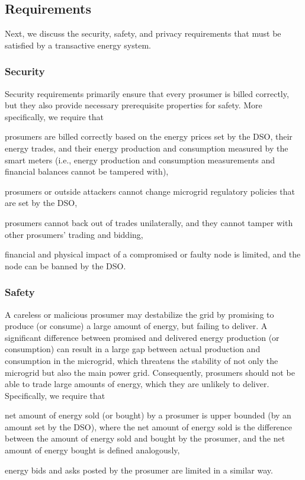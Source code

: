 \subsection{Requirements}
Next, we discuss the security, safety, and privacy requirements that must be satisfied by a transactive energy system.

\subsubsection{Security}
Security requirements primarily ensure that every prosumer is billed correctly, but they also provide necessary prerequisite properties for safety.
More specifically, we require that 
\begin{compactitem}
\item prosumers are billed correctly based on the energy prices set by the DSO, their energy trades, and their energy production and consumption measured by the smart meters (i.e., energy production and consumption measurements and financial balances cannot be tampered with),
\item prosumers or outside attackers cannot change microgrid regulatory policies that are set by the DSO,
\item prosumers cannot back out of trades unilaterally, and they cannot tamper with other prosumers' trading and bidding,
\item financial and physical impact of a compromised or faulty node is limited, and the node can be banned by the DSO.
\end{compactitem}

\subsubsection{Safety}
A careless or malicious prosumer may destabilize the grid by promising to produce (or consume) a large amount of energy, but failing to deliver.
A significant difference between promised and delivered energy production (or consumption) can result in a large gap between actual production and consumption in the microgrid, which threatens the stability of not only the microgrid but also the main power grid.
Consequently, prosumers should not be able to trade large amounts of energy, which they are unlikely to deliver.
Specifically, we require that
\begin{compactitem}
\item net amount of energy sold (or bought) by a prosumer is upper bounded (by an amount set by the DSO), where the net amount of energy sold is the difference between the amount of energy sold and bought by the prosumer, and the net amount of energy bought is defined analogously,
\item energy bids and asks posted by the prosumer are limited in a similar way.
\end{compactitem}

